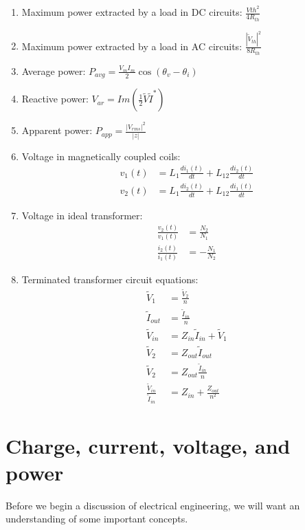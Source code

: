 \documentclass[nobib]{tufte-handout}
\begin{document}
\begin{enumerate}
    \item Maximum power extracted by a load in DC circuits: $\frac{V{th}^2}{4R_{th}}$
    \item Maximum power extracted by a load in AC circuits: $\frac{|\tilde{V}_{th}|^2}{8R_{th}}$
    \item Average power: $P_{avg} = \frac{V_m I_m}{2}\cos{(\theta_v - \theta_i)}$
    \item Reactive power: $V_{ar} = Im(\frac{1}{2}\tilde{V}\tilde{I}^*)$
    \item Apparent power: $P_{app} = \frac{|V_{rms}|^2}{|z|}$
    \item Voltage in magnetically coupled coils: 
    \begin{align*}
        v_{1}(t) &= L_1 \frac{di_1(t)}{dt} + L_{12}\frac{di_2(t)}{dt} \\
        v_{2}(t) &= L_1 \frac{di_2(t)}{dt} + L_{12}\frac{di_1(t)}{dt} 
    \end{align*}
    \item Voltage in ideal transformer: 
    \begin{align*}
        \frac{v_2(t)}{v_1(t)} &= \frac{N_2}{N_1} \\
        \frac{i_2(t)}{i_1(t)} &= -\frac{N_1}{N_2}   
    \end{align*}
    \item Terminated transformer circuit equations: 
    \begin{align*}
        \tilde{V}_1 &= \frac{\tilde{V}_2}{n} \\
        \tilde{I}_{out} &= \frac{\tilde{I}_{in}}{n} \\
        \tilde{V}_{in} &= Z_{in}\tilde{I}_{in} + \tilde{V}_1 \\
        \tilde{V}_2 &= Z_{out}\tilde{I}_{out} \\
        \tilde{V}_2 &= Z_{out}\frac{\tilde{I}_{in}}{n} \\
        \frac{\tilde{V}_{in}}{\tilde{I}_{in}} &= Z_{in} + \frac{Z_{out}}{n^2}
    \end{align*}

\end{enumerate}

\pagebreak 

\section{Charge, current, voltage, and power}
Before we begin a discussion
of electrical engineering, we will want an
understanding of some important concepts. 
\end{document}
